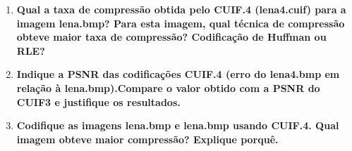 \documentclass[12pt, a4paper, oneside]{abntex2}
\begin{document}
\begin{enumerate}
        \item \textbf{Qual a taxa de compressão obtida pelo CUIF.4 (lena4.cuif) para a imagem lena.bmp?
        Para esta imagem, qual técnica de compressão obteve maior taxa de compressão?
        Codificação de Huffman ou RLE?}

        \item \textbf{Indique a PSNR das codificações CUIF.4 (erro do lena4.bmp em relação à lena.bmp).Compare o valor obtido com a PSNR do CUIF3 e justifique os resultados.}

        \item \textbf{Codifique as imagens lena.bmp e lena.bmp usando CUIF.4. Qual imagem obteve maior compressão?
        Explique porquê.}


    \end{enumerate}
\end{document}
